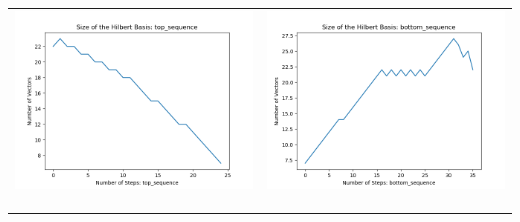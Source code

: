 \documentclass[10pt]{article}
\begin{document}
\begin{tabular}{c|c}
\begin{minipage}{.4\textwidth}
\includegraphics[width=\textwidth]{"DATA/5d/6 generators 2 bound H/top_sequence SIZE"}
\end{minipage} &
\begin{minipage}{.4\textwidth}
\includegraphics[width=\textwidth]{"DATA/5d/6 generators 2 bound H bottomup/bottom_sequence SIZE"}
\end{minipage} \\ \\
\hline \\\begin{minipage}{.4\textwidth}

\end{minipage}
\end{tabular}
\end{document}
